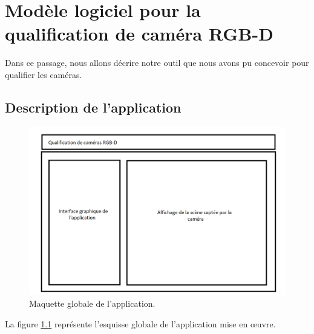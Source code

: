 \documentclass[a4paper, 12pt]{book}
\begin{document}
\chapter[Modèle logiciel pour la qualification]{Modèle logiciel pour la qualification de caméra RGB-D}
Dans ce passage, nous allons décrire notre outil que nous avons pu concevoir pour qualifier les caméras.


\section{Description de l'application}

\begin{center}
	\begin{figure}[H]
  		\hspace{0.1cm}
 		\includegraphics[scale=0.5]{images/maquetteApp1.png} \hspace{2cm}
  		\caption{Maquette globale de l'application.\label{fig-maquette}}
	\end{figure}
\end{center}

La figure \ref{fig-maquette} représente l'esquisse globale de l'application mise en œuvre. 
\end{document}
